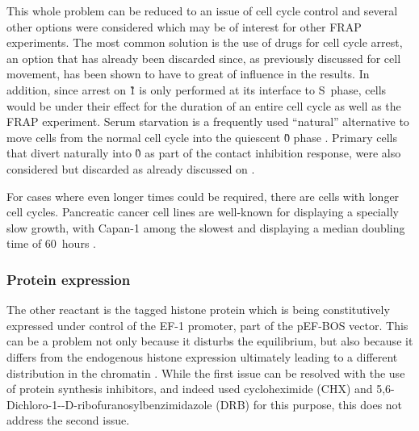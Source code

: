       This whole problem can be reduced to an issue of cell cycle control and
      several other options were considered which may be of interest for
      other FRAP experiments. The most common solution is the use
      of drugs for cell cycle arrest, an option that has already been
      discarded since, as previously discussed for cell movement, has been
      shown to have to great of influence in the results.
      In addition, since arrest on \G1{} is only
      performed at its interface to S~phase, cells would be under their
      effect for the duration of an entire cell cycle as well as the FRAP
      experiment.
      Serum starvation is a frequently used ``natural''
      alternative to move cells from the normal cell cycle into the
      quiescent \G0{} phase \citep{SerumStarvation}.
      Primary cells that divert naturally into \G0{} as part of
      the contact inhibition response, were also considered but
      discarded as already discussed on .

      For cases where even longer times could be required, there are cells
      with longer cell cycles. Pancreatic cancer cell lines are well-known
      for displaying a specially slow growth, with Capan-1 among the slowest
      and displaying a median doubling time of 60~hours \citep{PancreaticCells}.

    \subsubsection{Protein expression}

      The other reactant is the tagged histone protein which is being
      constitutively expressed under control of the EF-1\textalpha{} promoter,
      part of the pEF-BOS vector. This can be a problem not only because it
      disturbs the equilibrium, but also because it differs from the endogenous
      histone expression ultimately leading to a different distribution in the
      chromatin \citep{KimuraCook}.
      While the first issue can be resolved with the use of protein synthesis
      inhibitors, and indeed \cite{KimuraCook} used cycloheximide (CHX) and
      5,6-Dichloro-1-\textbeta{}-D-ribofuranosylbenzimidazole (DRB) for this purpose,
      this does not address the second issue.

